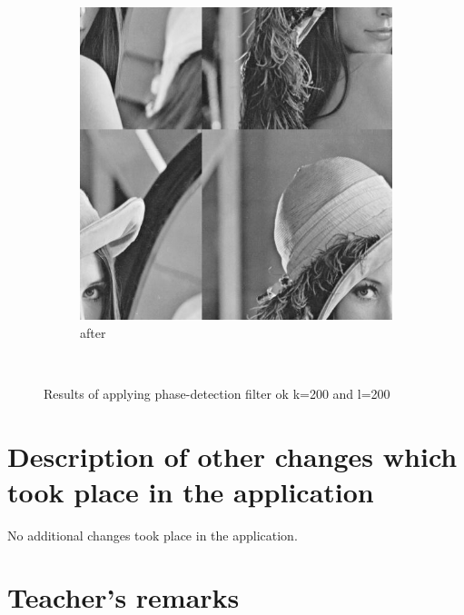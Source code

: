 \documentclass[12pt]{article}
\begin{document}
\begin{figure}[H]
\begin{subfigure}[t]{\subfiguresize}
        \includegraphics[width=\textwidth]{img/lena_phase.png}
        \caption{after}
    \end{subfigure}\\[1em]
    \caption{Results of applying phase-detection filter ok k=200 and l=200}
\end{figure}  
\section{Description of other changes which took place in the application}

No additional changes took place in the application.

\vfill
\section*{Teacher's remarks}
\begin{tabularx}{\textwidth}{|X|}
    \hline
    \vspace{7cm}
    \phantom{.} \\
    \hline
\end{tabularx}
\end{document}
